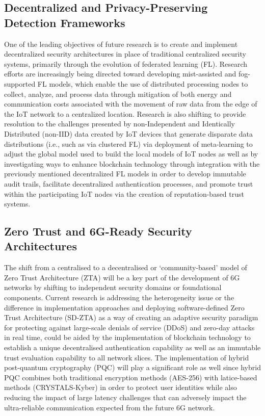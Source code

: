 \documentclass[12pt]{article}
\begin{document}
    \subsection{Decentralized and Privacy-Preserving Detection Frameworks}
One of the leading objectives of future research is to create and implement decentralized security architectures in place of traditional centralized security systems, primarily through the evolution of federated learning (FL). Research efforts are increasingly being directed toward developing mist-assisted and fog-supported FL models, which enable the use of distributed processing nodes to collect, analyze, and process data through mitigation of both energy and communication costs associated with the movement of raw data from the edge of the IoT network to a centralized location. Research is also shifting to provide resolution to the challenges presented by non-Independent and Identically Distributed (non-IID) data created by IoT devices that generate disparate data distributions (i.e., such as via clustered FL) via deployment of meta-learning to adjust the global model used to build the local models of IoT nodes as well as by investigating ways to enhance blockchain technology through integration with the previously mentioned decentralized FL models in order to develop immutable audit trails, facilitate decentralized authentication processes, and promote trust within the participating IoT nodes via the creation of reputation-based trust systems.
	
\subsection{Zero Trust and 6G-Ready Security Architectures}
The shift from a centralised to a decentralised or ‘community-based’ model of Zero Trust Architecture (ZTA) will be a key part of the development of 6G networks by shifting to independent security domains or foundational components. Current research is addressing the heterogeneity issue or the difference in implementation approaches and deploying software-defined Zero Trust Architecture (SD-ZTA) as a way of creating an adaptive security paradigm for protecting against large-scale denials of service (DDoS) and zero-day attacks in real time, could be aided by the implementation of blockchain technology to establish a unique decentralised authentication capability as well as an immutable trust evaluation capability to all network slices. The implementation of hybrid post-quantum cryptography (PQC) will play a significant role as well since hybrid PQC combines both traditional encryption methods (AES-256) with latice-based methods (CRYSTALS-Kyber) in order to protect user identities while also reducing the impact of large latency challenges that can adversely impact the ultra-reliable communication expected from the future 6G network.
\end{document}

